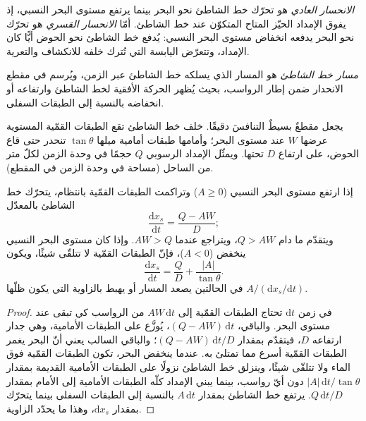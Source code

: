 \begin{definition}\label{def:b3:sequence-stratigraphy:regression}
\emph{الانحسار العادي} هو تحرّك خط الشاطئ نحو البحر
بينما يرتفع مستوى البحر النسبي، إذ يفوق الإمداد
الحيّز المتاح المتكوّن عند خط الشاطئ. أمّا \emph{الانحسار القسري}
هو تحرّك نحو البحر يدفعه انخفاض مستوى البحر النسبي:
يُدفع خط الشاطئ نحو الحوض أيًّا كان الإمداد، وتتعرّض اليابسة التي تُترك خلفه
للانكشاف والتعرية.
\end{definition}

\begin{definition}\label{def:b3:sequence-stratigraphy:trajectory}
\emph{مسار خط الشاطئ} هو المسار الذي يسلكه خط الشاطئ
عبر الزمن، ويُرسم في مقطع الانحدار ضمن إطار
الرواسب، بحيث يُظهر الحركة الأفقية لخط الشاطئ وارتفاعه
أو انخفاضه بالنسبة إلى الطبقات السفلى.
\end{definition}

يجعل مقطعٌ بسيطٌ التنافسَ دقيقًا. خلف خط الشاطئ تقع الطبقات القمّية
المستوية عرضها $W$ عند مستوى البحر؛ وأمامها طبقات أمامية ميلها
$\tan\theta$ تنحدر حتى قاع الحوض، على ارتفاع $D$ تحتها.
ويمثّل الإمداد الرسوبي $Q$ حجمًا في وحدة الزمن لكلّ متر من الساحل (مساحة في وحدة
الزمن في المقطع).

\begin{proposition}\label{prop:b3:sequence-stratigraphy:trajectory}
إذا ارتفع مستوى البحر النسبي ($A \ge 0$) وتراكمت الطبقات القمّية بانتظام،
يتحرّك خط الشاطئ بالمعدّل
\[
\frac{\mathrm dx_s}{\mathrm dt} = \frac{Q - AW}{D};
\]
ويتقدّم ما دام $Q > AW$، ويتراجع عندما $AW > Q$. وإذا كان مستوى البحر النسبي
ينخفض ($A < 0$)، فإنّ الطبقات القمّية لا تتلقّى شيئًا، ويكون
\[
\frac{\mathrm dx_s}{\mathrm dt} = \frac{Q}{D} + \frac{|A|}{\tan\theta}.
\]
في الحالتين يصعد المسار أو يهبط بالزاوية التي يكون ظلّها
$A/(\mathrm dx_s/\mathrm dt)$.
\end{proposition}

\begin{proof}
في زمن $\mathrm dt$ تحتاج الطبقات القمّية إلى $AW\,\mathrm dt$ من الرواسب كي تبقى
عند مستوى البحر. والباقي، $(Q - AW)\,\mathrm dt$، يُوزَّع على الطبقات الأمامية،
وهي جدار ارتفاعه $D$، فيتقدّم بمقدار $(Q - AW)\,\mathrm dt/D$؛ والباقي السالب
يعني أنّ البحر يغمر الطبقات القمّية أسرع مما تمتلئ به.
عندما ينخفض البحر، تكون الطبقات القمّية فوق الماء ولا تتلقّى شيئًا، وينزلق خط الشاطئ
نزولًا على الطبقات الأمامية القديمة بمقدار $|A|\,\mathrm dt/\tan\theta$ دون أيّ
رواسب، بينما يبني الإمداد كلّه الطبقات الأمامية إلى الأمام بمقدار $Q\,\mathrm
dt/D$. يرتفع خط الشاطئ بمقدار $A\,\mathrm dt$ بالنسبة إلى الطبقات السفلى
بينما يتحرّك بمقدار $\mathrm dx_s$، وهذا ما يحدّد الزاوية.
\end{proof}

